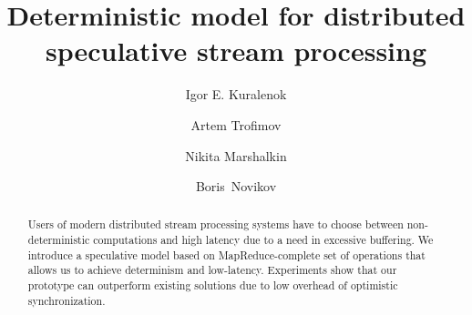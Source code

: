 \documentclass{llncs}
\begin{document}
\title {Deterministic model for distributed speculative stream processing}
\author{Igor E. Kuralenok
       \and Artem Trofimov
       \and Nikita Marshalkin
      \and Boris~Novikov}

\maketitle

\begin{abstract}
Users of modern distributed stream processing systems have to choose between non-deterministic computations and high latency due to a need in excessive buffering. 
We introduce a speculative model based on MapReduce-complete set of operations that allows us to achieve determinism and low-latency.
Experiments show that our prototype can outperform existing solutions due to low overhead of optimistic synchronization.


\end {abstract}
\end{document}
